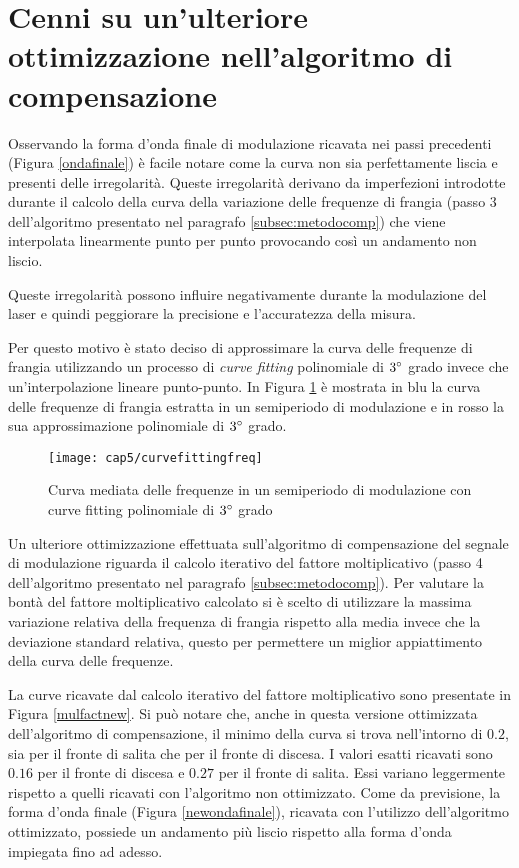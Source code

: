 \section{Cenni su un'ulteriore ottimizzazione nell'algoritmo di compensazione}
Osservando la forma d'onda finale di modulazione ricavata nei passi precedenti (Figura \ref{ondafinale}) è facile notare come la curva non sia perfettamente liscia e presenti delle irregolarità.
Queste irregolarità derivano da imperfezioni introdotte durante il calcolo della curva della variazione delle frequenze di frangia (passo $3$ dell'algoritmo presentato nel paragrafo \ref{subsec:metodocomp}) che viene interpolata linearmente punto per punto provocando così un andamento non liscio. 

Queste irregolarità possono influire negativamente durante la modulazione del laser e quindi peggiorare la precisione e l'accuratezza della misura. 

Per questo motivo è stato deciso di approssimare la curva delle frequenze di frangia utilizzando un processo di \textit{curve fitting} polinomiale di $3\degree$ grado invece che un'interpolazione lineare punto-punto. In Figura \ref{curvefittingfreq} è mostrata in blu la curva delle frequenze di frangia estratta in un semiperiodo di modulazione e in rosso la sua approssimazione polinomiale di $3\degree$ grado.
\begin{figure}[H]  
	\begin{center}
		\texttt{[image: cap5/curvefittingfreq]}
		\caption{Curva mediata delle frequenze in un semiperiodo di modulazione con curve fitting polinomiale di $3\degree$ grado}
		\label{curvefittingfreq}
	\end{center}
\end{figure}

Un ulteriore ottimizzazione effettuata sull'algoritmo di compensazione del segnale di modulazione riguarda il calcolo iterativo del fattore moltiplicativo (passo 4 dell'algoritmo presentato nel paragrafo \ref{subsec:metodocomp}). Per valutare la bontà del fattore moltiplicativo calcolato si è scelto di utilizzare la massima variazione relativa della frequenza di frangia rispetto alla media invece che la deviazione standard relativa, questo per permettere un miglior appiattimento della curva delle frequenze.

La curve ricavate dal calcolo iterativo del fattore moltiplicativo sono presentate in Figura \ref{mulfactnew}. Si può notare che, anche in questa versione ottimizzata dell'algoritmo di compensazione, il minimo della curva si trova nell'intorno di $0.2$, sia per il fronte di salita che per il fronte di discesa. I valori esatti ricavati sono $0.16$ per il fronte di discesa e $0.27$ per il fronte di salita. Essi variano leggermente rispetto a quelli ricavati con l'algoritmo non ottimizzato. 
Come da previsione, la forma d'onda finale (Figura \ref{newondafinale}), ricavata con l'utilizzo dell'algoritmo ottimizzato, possiede un andamento più liscio rispetto alla forma d'onda impiegata fino ad adesso.

